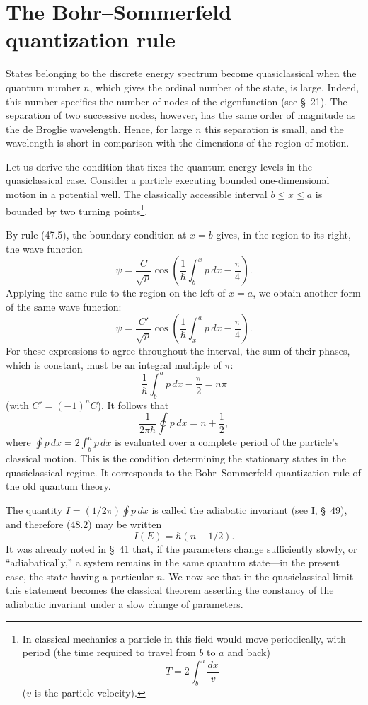 \section{The Bohr--Sommerfeld quantization rule}

States belonging to the discrete energy spectrum become quasiclassical when
the quantum number $n$, which gives the ordinal number of the state, is large.
Indeed, this number specifies the number of nodes of the eigenfunction (see
§~21). The separation of two successive nodes, however, has the same order of
magnitude as the de Broglie wavelength. Hence, for large $n$ this separation
is small, and the wavelength is short in comparison with the dimensions of the
region of motion.

Let us derive the condition that fixes the quantum energy levels in the
quasiclassical case. Consider a particle executing bounded one-dimensional
motion in a potential well. The classically accessible interval
$b\leq x\leq a$ is bounded by two turning points\footnote{In classical
mechanics a particle in this field would move periodically, with period (the
time required to travel from $b$ to $a$ and back)
\[
  T=2\int_b^a\frac{dx}{v}
\]
($v$ is the particle velocity).}.

By rule (47.5), the boundary condition at $x=b$ gives, in the region to its
right, the wave function
\begin{equation}
  \psi=\frac C{\sqrt p}\cos\left(\frac1\hbar\int_b^x p\,dx-\frac\pi4\right).
  \tag{48.1}
\end{equation}
Applying the same rule to the region on the left of $x=a$, we obtain another
form of the same wave function:
\[
  \psi=\frac{C'}{\sqrt p}\cos\left(\frac1\hbar\int_x^a p\,dx-\frac\pi4\right).
\]
For these expressions to agree throughout the interval, the sum of their
phases, which is constant, must be an integral multiple of $\pi$:
\[
  \frac1\hbar\int_b^a p\,dx-\frac\pi2=n\pi
\]
(with $C'=(-1)^nC$). It follows that
\begin{equation}
  \frac1{2\pi\hbar}\oint p\,dx=n+\frac12,
  \tag{48.2}
\end{equation}
where $\oint p\,dx=2\int_b^a p\,dx$ is evaluated over a complete period of
the particle's classical motion. This is the condition determining the
stationary states in the quasiclassical regime. It corresponds to the
Bohr--Sommerfeld quantization rule of the old quantum theory.

The quantity $I=(1/2\pi)\oint p\,dx$ is called the adiabatic invariant (see
I, §~49), and therefore (48.2) may be written
\[
  I(E)=\hbar(n+1/2).
\]
It was already noted in §~41 that, if the parameters change sufficiently
slowly, or ``adiabatically,'' a system remains in the same quantum state---in
the present case, the state having a particular $n$. We now see that in the
quasiclassical limit this statement becomes the classical theorem asserting
the constancy of the adiabatic invariant under a slow change of parameters.

